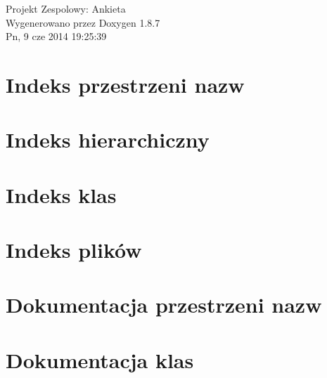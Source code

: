 \documentclass[twoside]{book}
\newcommand{\+}{\discretionary{\mbox{\scriptsize$\hookleftarrow$}}{}{}}
\newcommand{\clearemptydoublepage}{%
  \newpage{\pagestyle{empty}\cleardoublepage}%
}
\begin{document}
\hypersetup{pageanchor=false,
             bookmarks=true,
             bookmarksnumbered=true,
             pdfencoding=unicode
            }
\begin{titlepage}
\vspace*{7cm}
\begin{center}%
{\Large Projekt Zespolowy\+: Ankieta }\\
\vspace*{1cm}
{\large Wygenerowano przez Doxygen 1.8.7}\\
\vspace*{0.5cm}
{\small Pn, 9 cze 2014 19:25:39}\\
\end{center}
\end{titlepage}
\clearemptydoublepage
\tableofcontents
\clearemptydoublepage
{}
\hypersetup{pageanchor=true}

\chapter{Indeks przestrzeni nazw}

\chapter{Indeks hierarchiczny}

\chapter{Indeks klas}

\chapter{Indeks plików}

\chapter{Dokumentacja przestrzeni nazw}



\chapter{Dokumentacja klas}

















\end{document}
